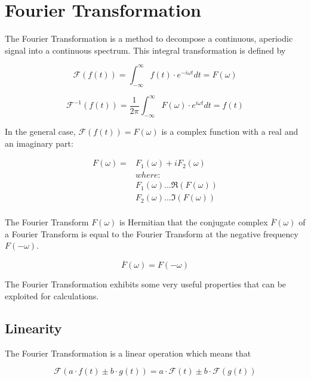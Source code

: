 \documentclass[./\jobname.tex]{subfiles}
\begin{document}
\chapter{Fourier Transformation}

The Fourier Transformation is a method to decompose a continuous, aperiodic signal into a continuous spectrum. This integral transformation is defined by

\begin{equation}
	\mathcal{F}(f(t)) = \int_{-\infty}^{\infty} f(t) \cdot e^{-i\omega t} dt = F(\omega) 
\end{equation}

\begin{equation}
	\mathcal{F}^{-1}(f(t)) = \frac{1}{2 \pi} \int_{-\infty}^{\infty} F(\omega) \cdot e^{i\omega t} dt = f(t) 
\end{equation}

In the general case, $\mathcal{F}(f(t)) = F(\omega)$ is a complex function with a real and an imaginary part:

\begin{equation}
	\begin{split}
	F(\omega) = & F_1(\omega) + i F_2(\omega) \\
	& where:\\
	& F_1(\omega) ... \Re(F(\omega)) \\
	& F_2(\omega) ... \Im(F(\omega)) \\
	\end{split}
\end{equation}

The Fourier Transform $F(\omega)$ is Hermitian that the conjugate complex $\overline{F}(\omega)$ of a Fourier Transform is equal to the Fourier Transform at the negative frequency $F(-\omega)$.

\begin{equation}
	\overline{F}(\omega) = F(-\omega)
\end{equation}

The Fourier Transformation exhibits some very useful properties that can be exploited for calculations. 

\section{Linearity}
The Fourier Transformation is a linear operation which means that

\begin{equation}
	\mathcal{F}(a \cdot f(t) \pm b \cdot g(t)) = a \cdot \mathcal{F}(t) \pm b \cdot \mathcal{F}(g(t))
\end{equation}
\end{document}
